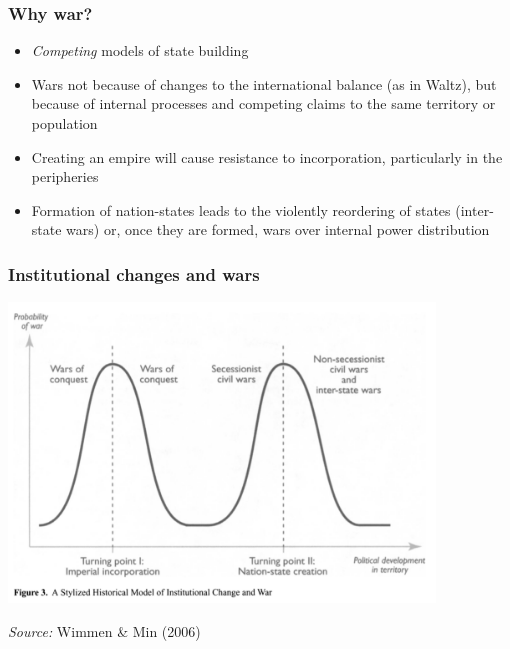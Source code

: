 \documentclass[aspectratio=43]{beamer}
\begin{document}
\begin{frame}
\frametitle{Why war?}
\centering

\begin{itemize}[<+->]
  \item \textit{Competing} models of state building
  \item Wars not because of changes to the international balance (as in Waltz), but because of internal processes and competing claims to the same territory or population
  \item Creating an empire will cause resistance to incorporation, particularly in the peripheries
  \item Formation of nation-states leads to the violently reordering of states (inter-state wars) or, once they are formed, wars over internal power distribution
\end{itemize}

\end{frame}


\begin{frame}
\frametitle{Institutional changes and wars}
\centering

\includegraphics[width = 0.85\textwidth]{img/wimmer_min_fig3}

{\scriptsize \textit{Source:} Wimmen \& Min (2006)}

\end{frame}
\end{document}

